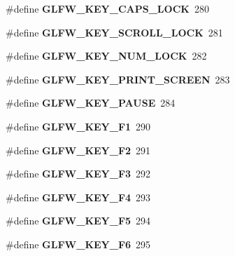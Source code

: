 \begin{DoxyCompactItemize}
\item 
\mbox{\label{group__keys_ga92c1d2c9d63485f3d70f94f688d48672}} 
\#define {\bfseries G\+L\+F\+W\+\_\+\+K\+E\+Y\+\_\+\+C\+A\+P\+S\+\_\+\+L\+O\+CK}~280
\item 
\mbox{\label{group__keys_gaf622b63b9537f7084c2ab649b8365630}} 
\#define {\bfseries G\+L\+F\+W\+\_\+\+K\+E\+Y\+\_\+\+S\+C\+R\+O\+L\+L\+\_\+\+L\+O\+CK}~281
\item 
\mbox{\label{group__keys_ga3946edc362aeff213b2be6304296cf43}} 
\#define {\bfseries G\+L\+F\+W\+\_\+\+K\+E\+Y\+\_\+\+N\+U\+M\+\_\+\+L\+O\+CK}~282
\item 
\mbox{\label{group__keys_gaf964c2e65e97d0cf785a5636ee8df642}} 
\#define {\bfseries G\+L\+F\+W\+\_\+\+K\+E\+Y\+\_\+\+P\+R\+I\+N\+T\+\_\+\+S\+C\+R\+E\+EN}~283
\item 
\mbox{\label{group__keys_ga8116b9692d87382afb5849b6d8907f18}} 
\#define {\bfseries G\+L\+F\+W\+\_\+\+K\+E\+Y\+\_\+\+P\+A\+U\+SE}~284
\item 
\mbox{\label{group__keys_gafb8d66c573acf22e364049477dcbea30}} 
\#define {\bfseries G\+L\+F\+W\+\_\+\+K\+E\+Y\+\_\+\+F1}~290
\item 
\mbox{\label{group__keys_ga0900750aff94889b940f5e428c07daee}} 
\#define {\bfseries G\+L\+F\+W\+\_\+\+K\+E\+Y\+\_\+\+F2}~291
\item 
\mbox{\label{group__keys_gaed7cd729c0147a551bb8b7bb36c17015}} 
\#define {\bfseries G\+L\+F\+W\+\_\+\+K\+E\+Y\+\_\+\+F3}~292
\item 
\mbox{\label{group__keys_ga9b61ebd0c63b44b7332fda2c9763eaa6}} 
\#define {\bfseries G\+L\+F\+W\+\_\+\+K\+E\+Y\+\_\+\+F4}~293
\item 
\mbox{\label{group__keys_gaf258dda9947daa428377938ed577c8c2}} 
\#define {\bfseries G\+L\+F\+W\+\_\+\+K\+E\+Y\+\_\+\+F5}~294
\item 
\mbox{\label{group__keys_ga6dc2d3f87b9d51ffbbbe2ef0299d8e1d}} 
\#define {\bfseries G\+L\+F\+W\+\_\+\+K\+E\+Y\+\_\+\+F6}~295

\end{DoxyCompactItemize}
